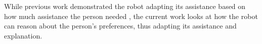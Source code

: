 \documentclass[letterpaper]{article} %
\begin{document}
While previous work demonstrated the robot adapting its assistance based on how much assistance the person needed \cite{wilson2020challenges}, the current work looks at how the robot can reason about the person's preferences, thus adapting its assistance and explanation.  






\end{document}

